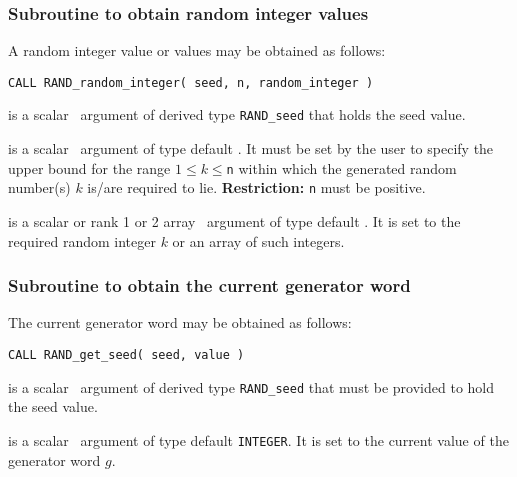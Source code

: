 \documentclass{galahad}
\newcommand{\packagename}{RAND}
\begin{document}

\subsubsection{Subroutine to obtain random integer values}
A random integer value or values may be obtained as follows:
\vspace*{1mm}

\hskip0.5in
{\tt CALL \packagename\_random\_integer( seed, n, random\_integer )}

\vspace*{-2mm}
\begin{description}
 is a scalar \intentinout\ argument of derived type
{\tt \packagename\_seed}  that holds the seed value.

 is a scalar \intentin\ argument of type default \integer.
It must be  set by the user to specify the upper bound for the range
$1 \leq k \leq ${\tt n}  within which the generated random number(s) $k$
is/are required to lie.
{\bf Restriction:}  {\tt n} must be positive.

 is a scalar  or rank 1 or 2 array
\intentout\ argument of type default  \integer.
It is set to the required random integer $k$
or an array of such integers.

\end{description}


\subsubsection{Subroutine to obtain the current generator word}
The current generator word may be obtained as follows:
\vspace*{1mm}

\hskip0.5in
{\tt CALL \packagename\_get\_seed( seed, value )}

\vspace*{-2mm}
\begin{description}
 is a scalar \intentin\ argument of derived type
{\tt \packagename\_seed} that must be provided to hold the seed value.

 is a scalar \intentout\ argument of type default
{\tt INTEGER}.
It is set to the current value of the generator \linebreak word $g$.
\end{description}
\end{document}
